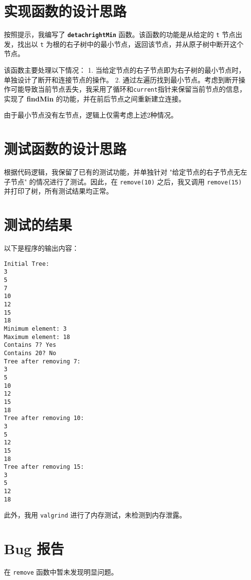 \documentclass[UTF8]{ctexart}
\begin{document}
\pagestyle{fancy}
\fancyhead{}

\section{实现函数的设计思路}
按照提示，我编写了 \textbf{\texttt{detachrightMin}} 函数。该函数的功能是从给定的 \texttt{t} 节点出发，找出以 \texttt{t} 为根的右子树中的最小节点，返回该节点，并从原子树中断开这个节点。

该函数主要处理以下情况：
1. 当给定节点的右子节点即为右子树的最小节点时，单独设计了断开和连接节点的操作。
2. 通过左遍历找到最小节点。考虑到断开操作可能导致当前节点丢失，我采用了循环和\texttt{current}指针来保留当前节点的信息，实现了 \textbf{findMin} 的功能，并在前后节点之间重新建立连接。

由于最小节点没有左节点，逻辑上仅需考虑上述2种情况。

\section{测试函数的设计思路}
根据代码逻辑，我保留了已有的测试功能，并单独针对 "给定节点的右子节点无左子节点" 的情况进行了测试。因此，在 \texttt{remove(10)} 之后，我又调用 \texttt{remove(15)} 并打印了树，所有测试结果均正常。
\section{测试的结果}
以下是程序的输出内容：
\begin{verbatim}
Initial Tree:
3
5
7
10
12
15
18
Minimum element: 3
Maximum element: 18
Contains 7? Yes
Contains 20? No
Tree after removing 7:
3
5
10
12
15
18
Tree after removing 10:
3
5
12
15
18
Tree after removing 15:
3
5
12
18
\end{verbatim}

此外，我用 \texttt{valgrind} 进行了内存测试，未检测到内存泄露。

\section{Bug 报告}
在 \texttt{remove} 函数中暂未发现明显问题。
\end{document}
